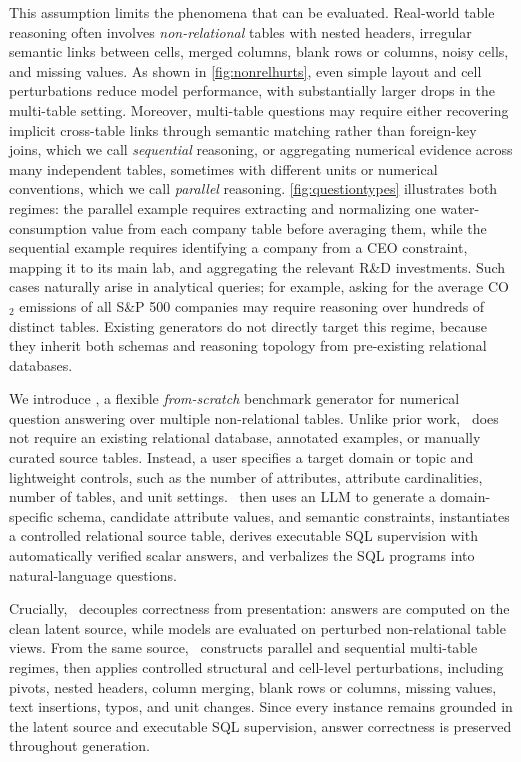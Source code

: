 This assumption limits the phenomena that can be evaluated. Real-world table reasoning often involves \emph{non-relational} tables with nested headers, irregular semantic links between cells, merged columns, blank rows or columns, noisy cells, and missing values. As shown in \autoref{fig:nonrelhurts}, even simple layout and cell perturbations reduce model performance, with substantially larger drops in the multi-table setting. Moreover, multi-table questions may require either recovering implicit cross-table links through semantic matching rather than foreign-key joins, which we call \emph{sequential} reasoning, or aggregating numerical evidence across many independent tables, sometimes with different units or numerical conventions, which we call \emph{parallel} reasoning. \autoref{fig:questiontypes} illustrates both regimes: the parallel example requires extracting and normalizing one water-consumption value from each company table before averaging them, while the sequential example requires identifying a company from a CEO constraint, mapping it to its main lab, and aggregating the relevant R\&D investments. Such cases naturally arise in analytical queries; for example, asking for the average CO$_2$ emissions of all S\&P 500 companies may require reasoning over hundreds of distinct tables. Existing generators do not directly target this regime, because they inherit both schemas and reasoning topology from pre-existing relational databases.

We introduce \name, a flexible \emph{from-scratch} benchmark generator for numerical question answering over multiple non-relational tables. Unlike prior work, \name~does not require an existing relational database, annotated examples, or manually curated source tables. Instead, a user specifies a target domain or topic and lightweight controls, such as the number of attributes, attribute cardinalities, number of tables, and unit settings. \name~then uses an LLM to generate a domain-specific schema, candidate attribute values, and semantic constraints, instantiates a controlled relational source table, derives executable SQL supervision with automatically verified scalar answers, and verbalizes the SQL programs into natural-language questions.

Crucially, \name~decouples correctness from presentation: answers are computed on the clean latent source, while models are evaluated on perturbed non-relational table views. From the same source, \name~constructs parallel and sequential multi-table regimes, then applies controlled structural and cell-level perturbations, including pivots, nested headers, column merging, blank rows or columns, missing values, text insertions, typos, and unit changes. Since every instance remains grounded in the latent source and executable SQL supervision, answer correctness is preserved throughout generation.

